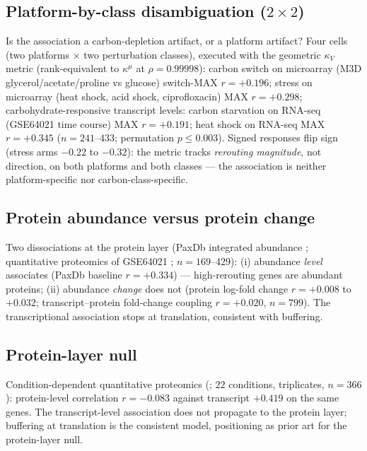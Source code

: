 \documentclass[11pt,a4paper]{article}
\theoremstyle{plain}
\theoremstyle{definition}
\theoremstyle{remark}
\newcommand{\kk}{\kappa_{\!V}}
\newcommand{\kmu}{\kappa^{\mu}}
\begin{document}
\subsection{Platform-by-class disambiguation ($2 \times 2$)}
\label{sec:e25}
Is the association a carbon-depletion artifact, or a platform
artifact? Four cells (two platforms $\times$ two perturbation
classes), executed with the geometric $\kk$ metric (rank-equivalent
to $\kmu$ at $\rho = 0.99998$): carbon switch on microarray (M3D
glycerol/acetate/proline vs glucose) switch-MAX $r = +0.196$; stress
on microarray (heat shock, acid shock, ciprofloxacin) MAX $r =
+0.298$; carbohydrate-responsive transcript levels: carbon starvation on RNA-seq (GSE64021 \citep{barrett2013} time course) MAX $r =
+0.191$; heat shock on RNA-seq MAX $r = +0.345$ ($n = 241$--$433$;
permutation $p \le 0.003$). Signed responses flip sign (stress arms
$-0.22$ to $-0.32$): the metric tracks \emph{rerouting magnitude},
not direction, on both platforms and both classes --- the association
is neither platform-specific nor carbon-class-specific.

\subsection{Protein abundance versus protein change}
\label{sec:e26}
Two dissociations at the protein layer (PaxDb integrated
abundance \citep{wang2015}; quantitative proteomics of GSE64021
\citep{barrett2013};
$n = 169$--$429$): (i) abundance
\emph{level} associates (PaxDb baseline $r = +0.334$) ---
high-rerouting genes are abundant proteins; (ii) abundance
\emph{change} does not (protein log-fold change $r = +0.008$ to
$+0.032$; transcript--protein fold-change coupling $r = +0.020$,
$n = 799$). The transcriptional association stops at translation,
consistent with buffering.

\subsection{Protein-layer null}
\label{sec:e27}
Condition-dependent quantitative proteomics (\citet{schmidt2016}; $22$ conditions, triplicates,
$n = 366$): protein-level correlation $r = -0.083$ against transcript
$+0.419$ on the same genes. The transcript-level association does not
propagate to the protein layer; buffering at translation is the consistent
model, positioning \citet{kochanowski2013} as prior art for the protein-layer
null.

\end{document}
